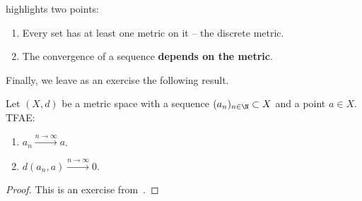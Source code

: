 highlights two points:
\begin{enumerate}
	\item Every set has at least one metric on it -- the discrete metric.
	\item The convergence of a sequence \textbf{depends on the metric}.
\end{enumerate}
Finally, we leave as an exercise the following result.
\begin{ex}
\label{ex:cvg_metric}
Let $(X,d)$ be a metric space with a sequence $(a_n)_{n\in\N}\subset X$ and a point $a\in X$. TFAE:
\begin{enumerate}
	\item $a_n\overset{n\to \infty}{\to} a$.
	\item $d(a_n,a)\overset{n\to \infty}{\to}0$.
\end{enumerate}
\end{ex}
\begin{proof}
	This is an exercise from~.
\end{proof}